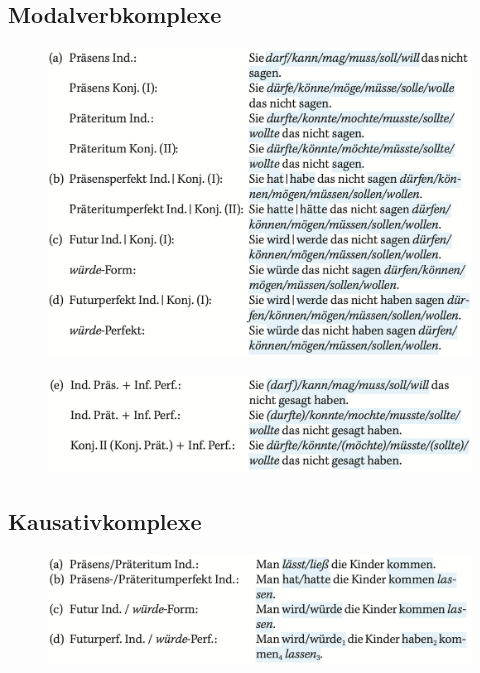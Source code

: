 \documentclass[UTF8]{report}
\begin{document}
\subsection{Modalverbkomplexe}
\begin{figure}[H]
    \centering
    \includegraphics[scale=0.5]{md1.png}
\end{figure}
\begin{figure}[H]
    \centering
    \includegraphics[scale=0.5]{md2.png}
\end{figure}

\subsection{Kausativkomplexe}
\begin{figure}[H]
    \centering
    \includegraphics[scale=0.6]{kp.png}
\end{figure}
\end{document}
